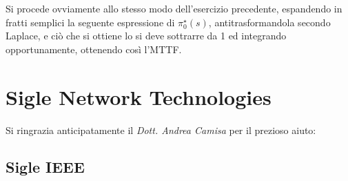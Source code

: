 Si procede ovviamente allo stesso modo dell'esercizio precedente, espandendo in fratti semplici la seguente espressione di $\pi_0^\star(s)$, antitrasformandola secondo Laplace, e ciò che si ottiene lo si deve sottrarre da 1 ed integrando opportunamente, ottenendo così l'MTTF.

\section{Sigle Network Technologies}

Si ringrazia anticipatamente il \emph{Dott. Andrea Camisa} per il prezioso aiuto:

\subsection{Sigle IEEE}

